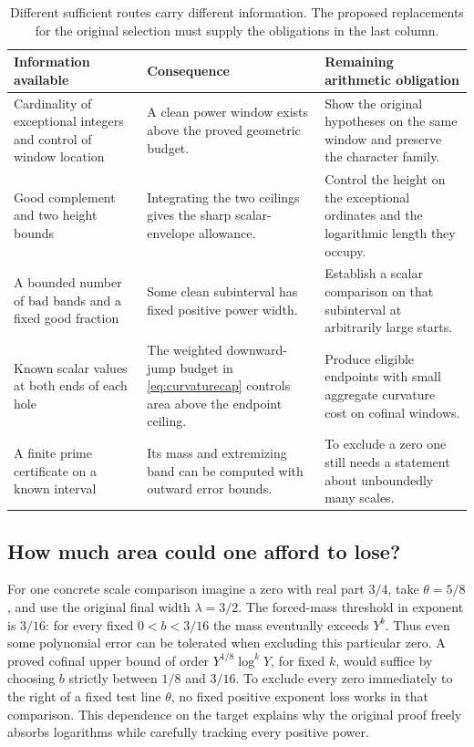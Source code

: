 \documentclass[12pt,letterpaper]{article}
\begin{document}
\begin{table}[htbp]\centering\footnotesize
\begin{tabularx}{\linewidth}{@{}p{.22\linewidth}YY@{}}
\toprule
Information available & Consequence & Remaining arithmetic obligation\\ \midrule
Cardinality of exceptional integers and control of window location & A clean power window exists above the proved geometric budget. & Show the original hypotheses on the same window and preserve the character family.\\
Good complement and two height bounds & Integrating the two ceilings gives the sharp scalar-envelope allowance. & Control the height on the exceptional ordinates and the logarithmic length they occupy.\\
A bounded number of bad bands and a fixed good fraction & Some clean subinterval has fixed positive power width. & Establish a scalar comparison on that subinterval at arbitrarily large starts.\\
Known scalar values at both ends of each hole & The weighted downward-jump budget in \eqref{eq:curvaturecap} controls area above the endpoint ceiling. & Produce eligible endpoints with small aggregate curvature cost on cofinal windows.\\
A finite prime certificate on a known interval & Its mass and extremizing band can be computed with outward error bounds. & To exclude a zero one still needs a statement about unboundedly many scales.\\
\bottomrule
\end{tabularx}
\caption{Different sufficient routes carry different information. The proposed replacements for the original selection must supply the obligations in the last column.}
\end{table}

\subsection{How much area could one afford to lose?}
For one concrete scale comparison imagine a zero with real part \(3/4\), take \(\theta=5/8\), and use the original final width \(\lambda=3/2\). The forced-mass threshold in exponent is \(3/16\): for every fixed \(0<b<3/16\) the mass eventually exceeds \(Y^b\). Thus even some polynomial error can be tolerated when excluding this particular zero. A proved cofinal upper bound of order \(Y^{1/8}\log^kY\), for fixed \(k\), would suffice by choosing \(b\) strictly between \(1/8\) and \(3/16\). To exclude every zero immediately to the right of a fixed test line \(\theta\), no fixed positive exponent loss works in that comparison. This dependence on the target explains why the original proof freely absorbs logarithms while carefully tracking every positive power.
\end{document}
